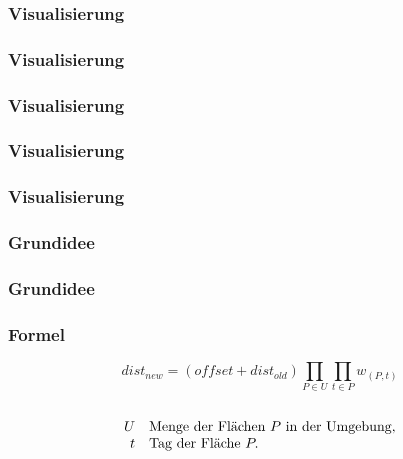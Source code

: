 \begin{frame}[fragile]
  \frametitle{Visualisierung}
  \lstset{language=XML,basicstyle=\tiny}
  
\end{frame}

\begin{frame}
  \frametitle{Visualisierung}
\end{frame}

\begin{frame}
  \frametitle{Visualisierung}
\end{frame}

\begin{frame}
  \frametitle{Visualisierung}
\end{frame}

\begin{frame}
  \frametitle{Visualisierung}
\end{frame}

\begin{frame} %
 \frametitle{Grundidee}
\end{frame}

\begin{frame} %
 \frametitle{Grundidee}
\end{frame}

\begin{frame}
  \frametitle{Formel}
  \begin{Large}
  \begin{equation*}
    dist_{new} = (offset + dist_{old}) \prod_{P \in U} \prod_{t\in P} w_{(P,t)}
  \end{equation*}
  \qquad \\
\begin{equation*}
\begin{array}{r l}
 U & \text{Menge der Fl\"achen $P$ in der Umgebung},\\
 t & \text{Tag der Fl\"ache }P.
\end{array}
\end{equation*}
\end{Large}
\end{frame}

